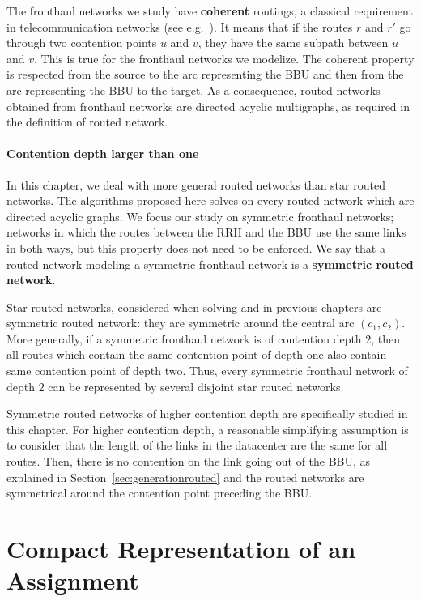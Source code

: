   
The fronthaul networks we study have \textbf{coherent} routings, a classical 
requirement in telecommunication networks (see e.g.~\cite{Schwiebert1996ANA}). It means that
if the routes $r$ and $r'$ go through two contention points $u$ and $v$, they have the same subpath
between $u$ and $v$.
This is true for the fronthaul networks we modelize. The coherent property is respected from the source 
to the arc representing the BBU and then from the arc representing the BBU to the target.
 As a consequence, routed networks obtained from fronthaul networks are directed acyclic multigraphs, as required in the definition of routed network.


\paragraph*{Contention depth larger than one}

In this chapter, we deal with more general routed networks than star routed networks. The algorithms proposed here solves \minstra on every routed network which are directed acyclic graphs. We focus our study on symmetric fronthaul networks; networks in which the routes between the RRH and the BBU use the same links in both ways, but this property does not need to be enforced. We say that a routed network modeling a symmetric fronthaul network is a \textbf{symmetric routed network}.

Star routed networks, considered when solving \pazl and \pall in previous chapters are symmetric routed network: they are symmetric around the central arc $(c_1,c_2)$. More generally, if a symmetric fronthaul network is of contention depth $2$, then all routes which contain the same contention point of depth one also contain same contention point of depth two. Thus, every symmetric fronthaul network of depth $2$ can be represented by several disjoint star routed networks.

Symmetric routed networks of higher contention depth are specifically studied in this chapter. For higher contention depth, a reasonable simplifying assumption is to consider that the length of the links in the datacenter are the same for all routes. Then, there is no contention on the link going out of the BBU, as explained in Section~\ref{sec:generationrouted} and the routed networks are symmetrical around the contention point preceding the BBU. 

\section{Compact Representation of an Assignment}

